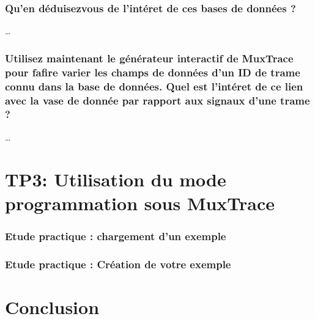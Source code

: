 \documentclass{rapportECC}
\begin{document}
\subsubsection*{Qu'en déduisezvous de l'intéret de ces bases de données ?}

\dots

\subsubsection*{Utilisez maintenant le générateur interactif de MuxTrace pour fafire varier les champs de données d'un ID de trame connu dans la base de données. Quel est l'intéret de ce lien avec la vase de donnée par rapport aux signaux d'une trame ?}

\dots



\section{TP3: Utilisation du mode programmation sous MuxTrace}


\subsubsection*{Etude practique : chargement d'un exemple}


\subsubsection*{Etude practique : Création de votre exemple}

\section{Conclusion}
\end{document}
